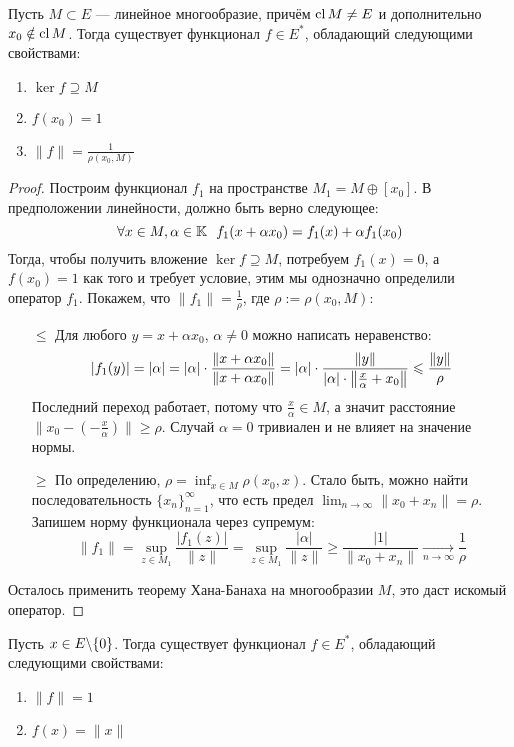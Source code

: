 \begin{corollary}
	Пусть $M \subset E$ --- линейное многообразие, причём $\operatorname{cl} M \neq E$ и дополнительно $x_0 \notin \operatorname{cl} M$. Тогда существует функционал $f \in E^*$, обладающий следующими свойствами:
	\begin{enumerate}
		\item $\ker f \supseteq M$
		
		\item $f(x_0) = 1$
		
		\item $\|f\| = \frac{1}{\rho(x_0, M)}$
	\end{enumerate}
\end{corollary}

\begin{proof}
	Построим функционал $f_1$ на пространстве $M_1 = M \oplus [x_0]$. В предположении линейности, должно быть верно следующее:
	\[
		\forall x \in M, \alpha \in \mathbb{K}\ \ f_1(x + \alpha x_0) = f_1(x) + \alpha f_1(x_0)
	\]
	Тогда, чтобы получить вложение $\ker f \supseteq M$, потребуем $f_1(x) = 0$, а $f(x_0) = 1$ как того и требует условие, этим мы однозначно определили оператор $f_1$. Покажем, что $\|f_1\| = \frac{1}{\rho}$, где $\rho := \rho(x_0, M)$:
	\begin{itemize}
		\item[$\le$] Для любого $y = x + \alpha x_0$, $\alpha \neq 0$ можно написать неравенство:
		\[
			|f_1(y)| = |\alpha| = |\alpha| \cdot \frac{\|x + \alpha x_0\|}{\|x + \alpha x_0\|} = |\alpha| \cdot \frac{\|y\|}{|\alpha| \cdot \left\|\frac{x}{\alpha} + x_0\right\|} \leqslant \frac{\|y\|}{\rho}
		\]
		Последний переход работает, потому что $\frac{x}{\alpha} \in M$, а значит расстояние $\|x_0 - (-\frac{x}{\alpha})\| \ge \rho$. Случай $\alpha = 0$ тривиален и не влияет на значение нормы.
		
		\item[$\ge$] По определению, $\rho = \inf_{x \in M} \rho(x_0, x)$. Стало быть, можно найти последовательность $\{x_n\}_{n = 1}^\infty$, что есть предел $\lim_{n \to \infty} \|x_0 + x_n\| = \rho$. Запишем норму функционала через супремум:
		\[
			\|f_1\| = \sup_{z \in M_1} \frac{|f_1(z)|}{\|z\|} = \sup_{z \in M_1} \frac{|\alpha|}{\|z\|} \ge \frac{|1|}{\|x_0 + x_n\|} \xrightarrow[n \to \infty]{} \frac{1}{\rho}
		\]
	\end{itemize}
	Осталось применить теорему Хана-Банаха на многообразии $M$, это даст искомый оператор.
\end{proof}

\begin{corollary}
	Пусть $x \in E \backslash \{0\}$. Тогда существует функционал $f \in E^*$, обладающий следующими свойствами:
	\begin{enumerate}
		\item $\|f\| = 1$
		
		\item $f(x) = \|x\|$
	\end{enumerate}
\end{corollary}

